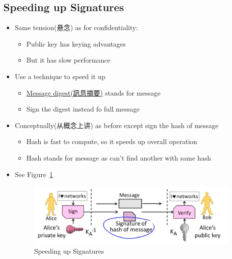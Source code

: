 \documentclass[12pt]{ctexart}   %
\begin{document}
	\subsection{Speeding up Signatures}
	\begin{itemize}
		\item Same tension(悬念) as for confidentiality:
		\begin{itemize}
			\item Public key has keying advantages
			\item But it has slow performance
		\end{itemize}

		\item Use a technique to speed it up
		\begin{itemize}
			\item \underline{Message digest(訊息摘要)} stands for message
			\item Sign the digest instead fo full message
		\end{itemize}

		\item Conceptually(从概念上讲) as before except sign the hash of message
		\begin{itemize}
			\item Hash is fast to compute, so it speeds up overall operation
			\item Hash stands for message as can't find another with same hash 
		\end{itemize}
		\item See Figure~\ref{fig:10-3-8}
		  
		\begin{figure}[h!] %
		\centering
		\includegraphics[scale=0.7]{images/10-3-8}
		\caption{Speeding up Signatures}
		\label{fig:10-3-8}
		\end{figure}
	\end{itemize}
\end{document}
